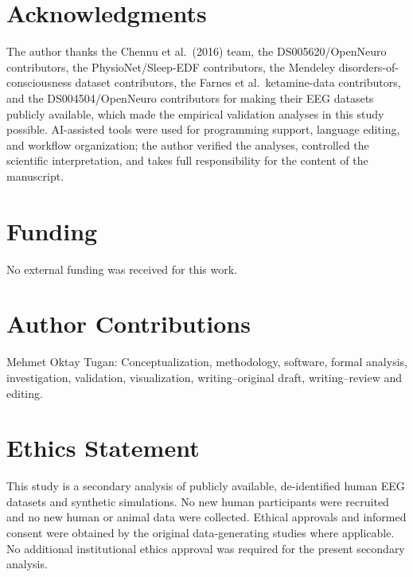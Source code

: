 \documentclass[11pt,a4paper]{article}
\theoremstyle{plain}
\theoremstyle{definition}
\theoremstyle{remark}
\begin{document}
\newpage
\section*{Acknowledgments}

The author thanks the Chennu et al.\ (2016) team, the DS005620/OpenNeuro contributors, the PhysioNet/Sleep-EDF contributors, the Mendeley disorders-of-consciousness dataset contributors, the Farnes et al.\ ketamine-data contributors, and the DS004504/OpenNeuro contributors for making their EEG datasets publicly available, which made the empirical validation analyses in this study possible. AI-assisted tools were used for programming support, language editing, and workflow organization; the author verified the analyses, controlled the scientific interpretation, and takes full responsibility for the content of the manuscript.

\section*{Funding}

No external funding was received for this work.

\section*{Author Contributions}

Mehmet Oktay Tugan: Conceptualization, methodology, software, formal analysis, investigation, validation, visualization, writing--original draft, writing--review and editing.

\section*{Ethics Statement}

This study is a secondary analysis of publicly available, de-identified human EEG datasets and synthetic simulations. No new human participants were recruited and no new human or animal data were collected. Ethical approvals and informed consent were obtained by the original data-generating studies where applicable. No additional institutional ethics approval was required for the present secondary analysis.
\end{document}
